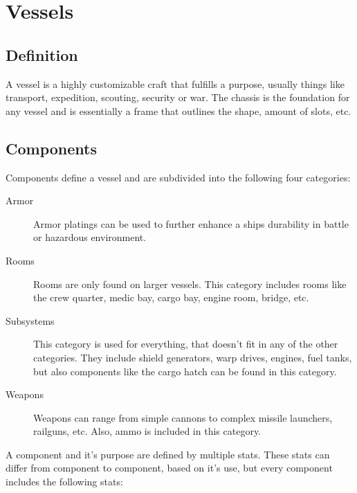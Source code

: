 \chapter{Vessels}
\label{chap:Vessels}



\section{Definition}
\label{sec:Vessels-Definition}

A vessel is a highly customizable craft that fulfills a purpose, usually things like transport, expedition, scouting, security or war. The chassis is the foundation for any vessel and is essentially a frame that outlines the shape, amount of slots, etc.

\section{Components}
\label{sec:Vessels-Components}

Components define a vessel and are subdivided into the following four categories:

\begin{description}
  \item[Armor] Armor platings can be used to further enhance a ships durability in battle or hazardous environment.
  \item[Rooms] Rooms are only found on larger vessels. This category includes rooms like the crew quarter, medic bay, cargo bay, engine room, bridge, etc.
  \item[Subsystems] This category is used for everything, that doesn't fit in any of the other categories. They include shield generators, warp drives, engines, fuel tanks, but also components like the cargo hatch can be found in this category.
  \item[Weapons] Weapons can range from simple cannons to complex missile launchers, railguns, etc. Also, ammo is included in this category.
\end{description}

A component and it's purpose are defined by multiple stats. These stats can differ from component to component, based on it's use, but every component includes the following stats:

